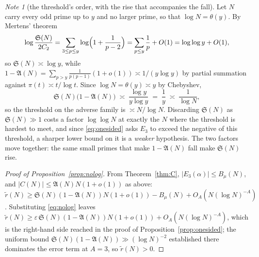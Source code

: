\documentclass[11pt,a4paper]{article}
\theoremstyle{plain}
\theoremstyle{definition}
\theoremstyle{remark}
\newtheorem{note}[theorem]{Note}
\renewcommand{\SS}{\mathfrak{S}}
\newcommand{\AAA}{\mathfrak{A}}
\begin{document}
\begin{note}[the threshold's order, with the rise that accompanies the
fall]\label{note:thresholdorder}
Let $N$ carry every odd prime up to $y$ and no larger prime, so that
$\log N=\theta(y)$. By Mertens' theorem
\[
  \log\frac{\SS(N)}{2C_2}
  =\sum_{3\le p\le y}\log\Bigl(1+\frac{1}{p-2}\Bigr)
  =\sum_{p\le y}\frac1p+O(1)=\log\log y+O(1),
\]
so $\SS(N)\asymp\log y$, while
$1-\AAA(N)=\sum_{p>y}\tfrac1{p(p-1)}(1+o(1))\asymp1/(y\log y)$ by
partial summation against $\pi(t)\asymp t/\log t$. Since
$\log N=\theta(y)\asymp y$ by Chebyshev,
\[
  \SS(N)\bigl(1-\AAA(N)\bigr)\;\asymp\;\frac{\log y}{y\log y}
   \;=\;\frac1y\;\asymp\;\frac1{\log N},
\]
so the threshold on the adverse family is $\asymp N/\log N$. Discarding
$\SS(N)$ as $\SS(N)\gg1$ costs a factor $\log\log N$ at exactly the
$N$ where the threshold is hardest to meet, and since
\eqref{eq:onesided} asks $E_3$ to exceed the negative of this
threshold, a sharper lower bound on it is a \emph{weaker} hypothesis.
The two factors move together: the same small primes that make
$1-\AAA(N)$ fall make $\SS(N)$ rise.
\end{note}

\begin{proof}[Proof of Proposition~\ref{prop:nolog}]
From Theorem~\ref{thm:C}, $|E_3(\alpha)|\le B_\mu(N)$, and
$|C(N)|\le\AAA(N)N(1+o(1))$ as above:
$\tilde r(N)\ge\SS(N)(1-\AAA(N))N(1+o(1))-B_\mu(N)
+O_A(N(\log N)^{-A})$. Substituting \eqref{eq:nolog} leaves
$\tilde r(N)\ge\varepsilon\,\SS(N)(1-\AAA(N))N(1+o(1))
+O_A(N(\log N)^{-A})$, which is the right-hand side reached in the
proof of Proposition~\ref{prop:onesided}; the uniform bound
$\SS(N)(1-\AAA(N))\gg(\log N)^{-2}$ established there dominates the
error term at $A=3$, so $\tilde r(N)>0$.
\end{proof}
\end{document}
